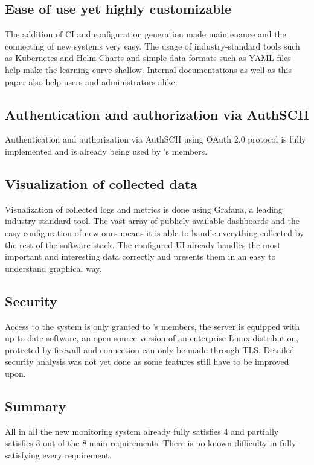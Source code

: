 \subsection{Ease of use yet highly customizable}

The addition of CI and configuration generation made maintenance and the
connecting of new systems very easy. The usage of industry-standard tools such
as Kubernetes and Helm Charts and simple data formats such as YAML files help
make the learning curve shallow. Internal documentations as well as this paper
also help users and administrators alike.

\subsection{Authentication and authorization via AuthSCH}

Authentication and authorization via AuthSCH using OAuth 2.0 protocol is fully
implemented and is already being used by \kszk's members.

\subsection{Visualization of collected data}

Visualization of collected logs and metrics is done using Grafana, a leading
industry-standard tool. The vast array of publicly available dashboards and the
easy configuration of new ones means it is able to handle everything collected
by the rest of the software stack. The configured UI already handles the most
important and interesting data correctly and presents them in an easy to
understand graphical way.

\subsection{Security}

Access to the system is only granted to \kszk's members, the server is equipped
with up to date software, an open source version of an enterprise Linux
distribution, protected by firewall and connection can only be made through
TLS. Detailed security analysis was not yet done as some features still have to
be improved upon.

\subsection{Summary}

All in all the new monitoring system already fully satisfies 4 and partially
satisfies 3 out of the 8 main requirements. There is no known difficulty in
fully satisfying every requirement.

